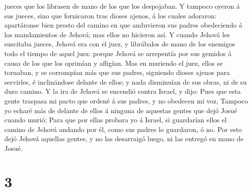 jueces que los librasen de mano de los que los despojaban. 
Y tampoco oyeron á sus jueces, sino que fornicaron tras dioses ajenos, á
los cuales adoraron: apartáronse bien presto del camino en que
anduvieron sus padres obedeciendo á los mandamientos de Jehová; mas
ellos no hicieron así.  Y cuando Jehová les suscitaba
jueces, Jehová era con el juez, y librábalos de mano de los enemigos
todo el tiempo de aquel juez: porque Jehová se arrepentía por sus
gemidos á causa de los que los oprimían y afligían.  Mas en
muriendo el juez, ellos se tornaban, y se corrompían más que sus padres,
siguiendo dioses ajenos para servirles, é inclinándose delante de ellos;
y nada disminuían de sus obras, ni de su duro camino.  Y la
ira de Jehová se encendió contra Israel, y dijo: Pues que esta gente
traspasa mi pacto que ordené á sus padres, y no obedecen mi voz,
 Tampoco yo echaré más de delante de ellos á ninguna de
aquestas gentes que dejó Josué cuando murió;  Para que por
ellas probara yo á Israel, si guardarían ellos el camino de Jehová
andando por él, como sus padres lo guardaron, ó no.  Por
esto dejó Jehová aquellas gentes, y no las desarraigó luego, ni las
entregó en mano de Josué.

\hypertarget{section-2}{%
\section{3}\label{section-2}}

